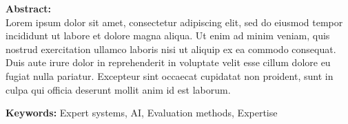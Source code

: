 
\thispagestyle{plain}
\vspace{0.9cm}

\noindent
\textbf{Abstract:\\}
Lorem ipsum dolor sit amet, consectetur adipiscing elit, sed do eiusmod tempor incididunt ut labore et dolore magna aliqua. Ut enim ad minim veniam, quis nostrud exercitation ullamco laboris nisi ut aliquip ex ea commodo consequat. Duis aute irure dolor in reprehenderit in voluptate velit esse cillum dolore eu fugiat nulla pariatur. Excepteur sint occaecat cupidatat non proident, sunt in culpa qui officia deserunt mollit anim id est laborum.

\vspace{0.5cm}
\noindent
\textbf{Keywords:} Expert systems, AI, Evaluation methods, Expertise
